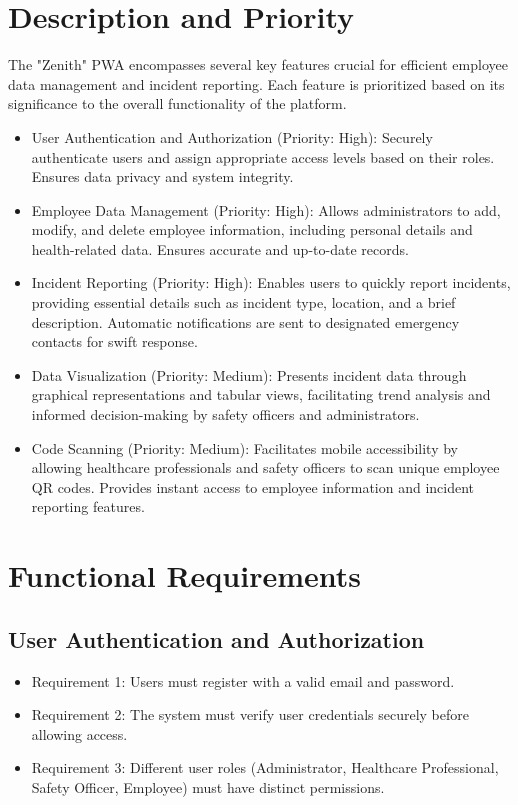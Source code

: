 \documentclass{scrreprt}
\begin{document}
\section{Description and Priority}
The "Zenith" PWA encompasses several key features crucial for efficient employee data management and incident reporting. Each feature is prioritized based on its significance to the overall functionality of the platform.

\begin{itemize}
    \item User Authentication and Authorization (Priority: High): Securely authenticate users and assign appropriate access levels based on their roles. Ensures data privacy and system integrity.
    \item Employee Data Management (Priority: High): Allows administrators to add, modify, and delete employee information, including personal details and health-related data. Ensures accurate and up-to-date records.
    \item Incident Reporting (Priority: High): Enables users to quickly report incidents, providing essential details such as incident type, location, and a brief description. Automatic notifications are sent to designated emergency contacts for swift response.
    \item Data Visualization (Priority: Medium): Presents incident data through graphical representations and tabular views, facilitating trend analysis and informed decision-making by safety officers and administrators.
    \item  Code Scanning (Priority: Medium): Facilitates mobile accessibility by allowing healthcare professionals and safety officers to scan unique employee QR codes. Provides instant access to employee information and incident reporting features.
\end{itemize}

\section{Functional Requirements}

\subsection{User Authentication and Authorization}

\begin{itemize}
    \item Requirement 1: Users must register with a valid email and password.
    \item Requirement 2: The system must verify user credentials securely before allowing access.
    \item Requirement 3: Different user roles (Administrator, Healthcare Professional, Safety Officer, Employee) must have distinct permissions.
\end{itemize}
\end{document}

